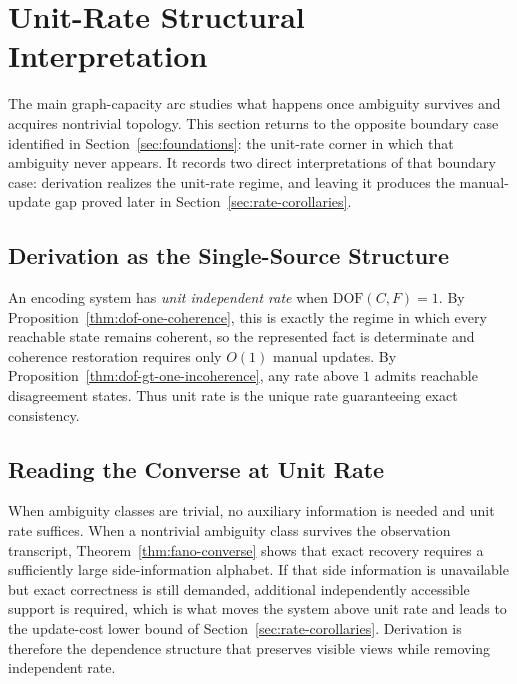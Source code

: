 \section{Unit-Rate Structural Interpretation}\label{sec:ssot}

The main graph-capacity arc studies what happens once ambiguity survives and acquires nontrivial topology. This section returns to the opposite boundary case identified in Section~\ref{sec:foundations}: the unit-rate corner in which that ambiguity never appears. It records two direct interpretations of that boundary case: derivation realizes the unit-rate regime, and leaving it produces the manual-update gap proved later in Section~\ref{sec:rate-corollaries}.

\subsection{Derivation as the Single-Source Structure}\label{sec:ssot-def}

An encoding system has \emph{unit independent rate} when $\text{DOF}(C,F)=1$. By Proposition~\ref{thm:dof-one-coherence}, this is exactly the regime in which every reachable state remains coherent, so the represented fact is determinate and coherence restoration requires only $O(1)$ manual updates. By Proposition~\ref{thm:dof-gt-one-incoherence}, any rate above $1$ admits reachable disagreement states. Thus unit rate is the unique rate guaranteeing exact consistency.

\subsection{Reading the Converse at Unit Rate}\label{sec:info-sketches}

When ambiguity classes are trivial, no auxiliary information is needed and unit rate suffices. When a nontrivial ambiguity class survives the observation transcript, Theorem~\ref{thm:fano-converse} shows that exact recovery requires a sufficiently large side-information alphabet. If that side information is unavailable but exact correctness is still demanded, additional independently accessible support is required, which is what moves the system above unit rate and leads to the update-cost lower bound of Section~\ref{sec:rate-corollaries}. Derivation is therefore the dependence structure that preserves visible views while removing independent rate.

